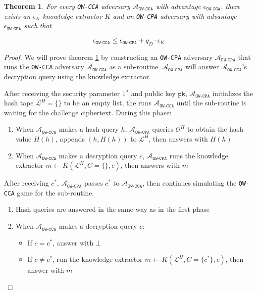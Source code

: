 \documentclass{article}
\newcommand{\monospace}{\texttt}
\newcommand{\pk}{\monospace{pk}}
\newtheorem{theorem}{Theorem}[section]
\begin{document}
\begin{theorem}\label{thm:pa-implies-cca}
    For every \monospace{OW-CCA} adversary $\mathcal{A}_\monospace{OW-CCA}$ with advantage $\epsilon_\monospace{OW-CCA}$, there exists an $\epsilon_K$ knowledge extractor $K$ and an \monospace{OW-CPA} adversary with advantage $\epsilon_\monospace{OW-CPA}$ such that

    \begin{equation*}
        \epsilon_\monospace{OW-CCA} \leq \epsilon_\monospace{OW-CPA} + q_D \cdot \epsilon_K
    \end{equation*}
\end{theorem}

\begin{proof}
    We will prove theorem \ref{thm:pa-implies-cca} by constructing an \monospace{OW-CPA} adversary $\mathcal{A}_\monospace{OW-CPA}$ that runs the \monospace{OW-CCA} adversary $\mathcal{A}_\monospace{OW-CCA}$ as a sub-routine. $\mathcal{A}_\monospace{OW-CPA}$ will answer $\mathcal{A}_\monospace{OW-CCA}$'s decryption query using the knowledge extractor.

    After receiving the security parameter $1^\lambda$ and public key $\pk$, $\mathcal{A}_\monospace{OW-CPA}$ initializes the hash tape $\mathcal{L}^H = \{\}$ to be an empty list, the runs $\mathcal{A}_\monospace{OW-CCA}$ until the sub-routine is waiting for the challenge ciphertext. During this phase:

    \begin{enumerate}
        \item When $\mathcal{A}_\monospace{OW-CCA}$ makes a hash query $h$, $\mathcal{A}_\monospace{OW-CPA}$ queries $\mathcal{O}^H$ to obtain the hash value $H(h)$, appends $(h, H(h))$ to $\mathcal{L}^H$, then answers with $H(h)$
        \item When $\mathcal{A}_\monospace{OW-CCA}$ makes a decryption query $c$, $\mathcal{A}_\monospace{OW-CPA}$ runs the knowledge extractor $m \leftarrow K(\mathcal{L}^H, C = \{\}, c)$, then answers with $m$
    \end{enumerate}

    After receiving $c^\ast$, $\mathcal{A}_\monospace{OW-CPA}$ passes $c^\ast$ to $\mathcal{A}_\monospace{OW-CCA}$, then continues simulating the \monospace{OW-CCA} game for the sub-routine.

    \begin{enumerate}
        \item Hash queries are answered in the same way as in the first phase
        \item When $\mathcal{A}_\monospace{OW-CCA}$ makes a decryption query $c$: \begin{itemize}
            \item If $c = c^\ast$, answer with $\bot$
            \item If $c \neq c^\ast$, run the knowledge extractor $m \leftarrow K(\mathcal{L}^H, C = \{c^\ast\}, c)$, then answer with $m$
        \end{itemize}
    \end{enumerate}


\end{proof}
\end{document}
